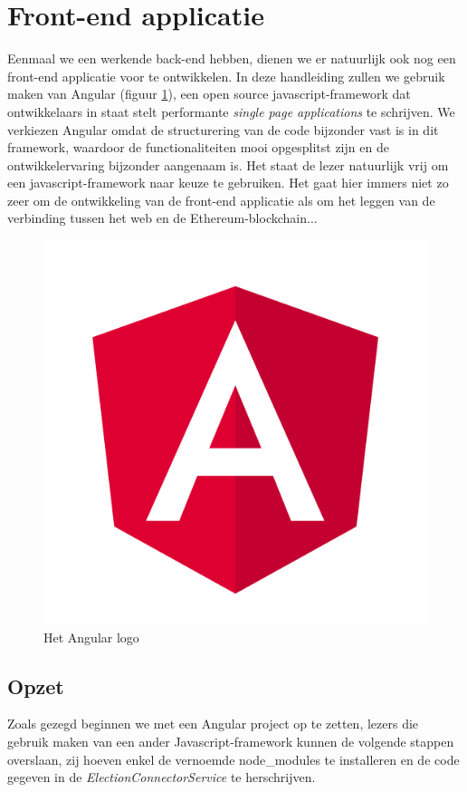 	\section{Front-end applicatie}
	Eenmaal we een werkende back-end hebben, dienen we er natuurlijk ook nog een front-end applicatie voor te ontwikkelen. In deze handleiding zullen we gebruik maken van Angular (figuur \ref{fig:angular}), een open source javascript-framework dat ontwikkelaars in staat stelt performante \textit{single page applications} te schrijven. We verkiezen Angular omdat de structurering van de code bijzonder vast is in dit framework, waardoor de functionaliteiten mooi opgesplitst zijn en de ontwikkelervaring bijzonder aangenaam is.  Het staat de lezer natuurlijk vrij om een javascript-framework naar keuze te gebruiken. Het gaat hier immers niet zo zeer om de ontwikkeling van de front-end applicatie als om het leggen van de verbinding tussen het web en de Ethereum-blockchain...
	\begin{figure}[h!]
		\centering
		\includegraphics[width=\linewidth/3]{img/angular.png}
		\caption{Het Angular logo ~\autocite{Angular2019}}
		\label{fig:angular}
	\end{figure}
	\subsection{Opzet}
	Zoals gezegd beginnen we met een Angular project op te zetten, lezers die gebruik maken van een ander Javascript-framework kunnen de volgende stappen overslaan, zij hoeven enkel de vernoemde node\_modules te installeren en de code gegeven in de \textit{ElectionConnectorService} te herschrijven. 
	
